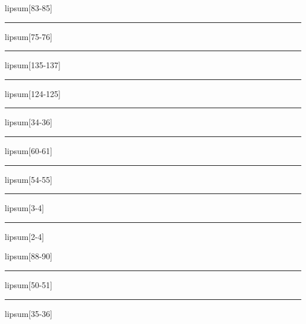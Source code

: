 \documentclass[11pt,a4paper]{article}
\begin{document}
lipsum[83-85]

\begin{simplewrap}
  \textcolor{lime!34}{\rule{5.5cm}{8.1cm}}
\end{simplewrap}
lipsum[75-76]

\begin{simplewrap}
  \textcolor{orange!54}{\rule{5.6cm}{4.6cm}}
\end{simplewrap}
lipsum[135-137]

\begin{simplewrap}
  \textcolor{yellow!49}{\rule{3.2cm}{6.6cm}}
\end{simplewrap}
lipsum[124-125]

\begin{simplewrap}
  \textcolor{violet!37}{\rule{4.8cm}{4.5cm}}
\end{simplewrap}
lipsum[34-36]

\begin{simplewrap}
  \textcolor{red!43}{\rule{5.2cm}{6.0cm}}
\end{simplewrap}
lipsum[60-61]

\begin{simplewrap}
  \textcolor{yellow!10}{\rule{3.4cm}{5.7cm}}
\end{simplewrap}
lipsum[54-55]

\begin{simplewrap}
  \textcolor{olive!36}{\rule{3.1cm}{4.8cm}}
\end{simplewrap}
lipsum[3-4]

\begin{simplewrap}
  \textcolor{violet!26}{\rule{5.4cm}{4.5cm}}
\end{simplewrap}
lipsum[2-4]

lipsum[88-90]

\begin{simplewrap}
  \textcolor{pink!56}{\rule{4.7cm}{9.7cm}}
\end{simplewrap}
lipsum[50-51]

\begin{simplewrap}
  \textcolor{brown!53}{\rule{4.4cm}{5.8cm}}
\end{simplewrap}
lipsum[35-36]
\end{document}
